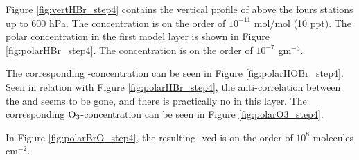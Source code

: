 
\medskip

Figure \ref{fig:vertHBr_step4} contains the vertical profile of  above the fours stations up to 600 hPa. The concentration is on the order of $10^{-11}$ mol/mol (10 ppt). The polar concentration in the first model layer is shown in Figure \ref{fig:polarHBr_step4}. The concentration is on the order of $10^{-7}$ gm$^{-3}$. 

\medskip






\medskip

The corresponding -concentration can be seen in Figure \ref{fig:polarHOBr_step4}. Seen in relation with Figure \ref{fig:polarHBr_step4}, the anti-correlation between the  and  seems to be gone, and there is practically no  in this layer. The corresponding $\mathrm{O_3}$-concentration can be seen in Figure \ref{fig:polarO3_step4}.



\medskip

In Figure \ref{fig:polarBrO_step4}, the resulting  -\acrshort{vcd} is on the order of $10^{8}$ molecules cm$^{-2}$. 










